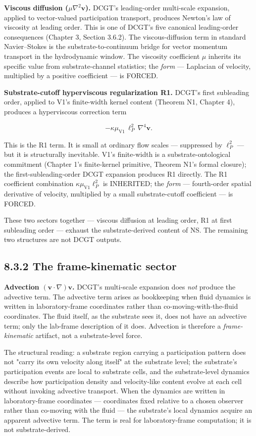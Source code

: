 \documentclass[11pt]{book}
\begin{document}
\textbf{Viscous diffusion ($\mu\nabla^2\mathbf{v}$).} DCGT's leading-order multi-scale expansion, applied to vector-valued participation transport, produces Newton's law of viscosity at leading order. This is one of DCGT's five canonical leading-order consequences (Chapter 3, Section 3.6.2). The viscous-diffusion term in standard Navier–Stokes is the substrate-to-continuum bridge for vector momentum transport in the hydrodynamic window. The viscosity coefficient $\mu$ inherits its specific value from substrate-channel statistics; the \textit{form} — Laplacian of velocity, multiplied by a positive coefficient — is FORCED.

\textbf{Substrate-cutoff hyperviscous regularization R1.} DCGT's first subleading order, applied to V1's finite-width kernel content (Theorem N1, Chapter 4), produces a hyperviscous correction term

\[
-\kappa\mu_{\mathrm{V1}}\,\ell_P^2\,\nabla^4\mathbf{v}.
\]

This is the R1 term. It is small at ordinary flow scales — suppressed by $\ell_P^2$ — but it is structurally inevitable. V1's finite-width is a substrate-ontological commitment (Chapter 1's finite-kernel primitive, Theorem N1's formal closure); the first-subleading-order DCGT expansion produces R1 directly. The R1 coefficient combination $\kappa\mu_{\mathrm{V1}}\ell_P^2$ is INHERITED; the \textit{form} — fourth-order spatial derivative of velocity, multiplied by a small substrate-cutoff coefficient — is FORCED.

These two sectors together — viscous diffusion at leading order, R1 at first subleading order — exhaust the substrate-derived content of NS. The remaining two structures are not DCGT outputs.

\subsection{8.3.2 The frame-kinematic sector}

\textbf{Advection $(\mathbf{v}\cdot\nabla)\mathbf{v}$.} DCGT's multi-scale expansion does \textit{not} produce the advective term. The advective term arises as bookkeeping when fluid dynamics is written in laboratory-frame coordinates rather than co-moving-with-the-fluid coordinates. The fluid itself, as the substrate sees it, does not have an advective term; only the lab-frame description of it does. Advection is therefore a \textit{frame-kinematic} artifact, not a substrate-level force.

The structural reading: a substrate region carrying a participation pattern does not "carry its own velocity along itself" at the substrate level; the substrate's participation events are local to substrate cells, and the substrate-level dynamics describe how participation density and velocity-like content evolve at each cell without invoking advective transport. When the dynamics are written in laboratory-frame coordinates — coordinates fixed relative to a chosen observer rather than co-moving with the fluid — the substrate's local dynamics acquire an apparent advective term. The term is real for laboratory-frame computation; it is not substrate-derived.
\end{document}
